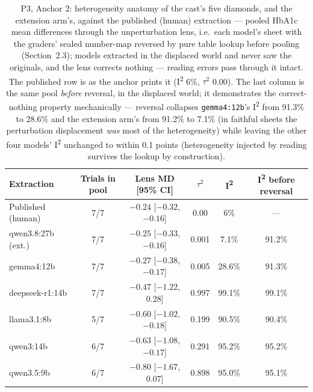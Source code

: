 \documentclass[11pt]{article}
\begin{document}
\begin{table}[H]
\centering\small
\caption{P3, Anchor 2: heterogeneity anatomy of the cast's five diamonds, and the extension arm's, against the published (human) extraction --- pooled HbA1c mean differences through the unperturbation lens, i.e.\ each model's sheet with the graders' sealed number-map reversed by pure table lookup before pooling (Section~2.3); models extracted in the displaced world and never saw the originals, and the lens corrects nothing --- reading errors pass through it intact. The published row is as the anchor prints it (I\textsuperscript{2} 6\%, $\tau^2$ 0.00). The last column is the same pool \emph{before} reversal, in the displaced world; it demonstrates the correct-nothing property mechanically --- reversal collapses \texttt{gemma4:12b}'s I\textsuperscript{2} from 91.3\% to 28.6\% and the extension arm's from 91.2\% to 7.1\% (in faithful sheets the perturbation displacement \emph{was} most of the heterogeneity) while leaving the other four models' I\textsuperscript{2} unchanged to within 0.1 points (heterogeneity injected by reading survives the lookup by construction).}
\label{tab:p3ma2}
\setlength{\tabcolsep}{5pt}
\begin{tabular}{lccccc}
\toprule
Extraction & Trials in pool & Lens MD [95\% CI] & $\tau^2$ & I\textsuperscript{2} & I\textsuperscript{2} before reversal \\
\midrule
Published (human) & 7/7 & $-0.24$ [$-0.32$, $-0.16$] & 0.00 & 6\% & --- \\
qwen3.8:27b (ext.) & 7/7 & $-0.25$ [$-0.33$, $-0.16$] & 0.001 & 7.1\% & 91.2\% \\
gemma4:12b & 7/7 & $-0.27$ [$-0.38$, $-0.17$] & 0.005 & 28.6\% & 91.3\% \\
deepseek-r1:14b & 7/7 & $-0.47$ [$-1.22$, 0.28] & 0.997 & 99.1\% & 99.1\% \\
llama3.1:8b & 5/7 & $-0.60$ [$-1.02$, $-0.18$] & 0.199 & 90.5\% & 90.4\% \\
qwen3:14b & 6/7 & $-0.63$ [$-1.08$, $-0.17$] & 0.291 & 95.2\% & 95.2\% \\
qwen3.5:9b & 6/7 & $-0.80$ [$-1.67$, 0.07] & 0.898 & 95.0\% & 95.1\% \\
\bottomrule
\end{tabular}
\end{table}
\end{document}
